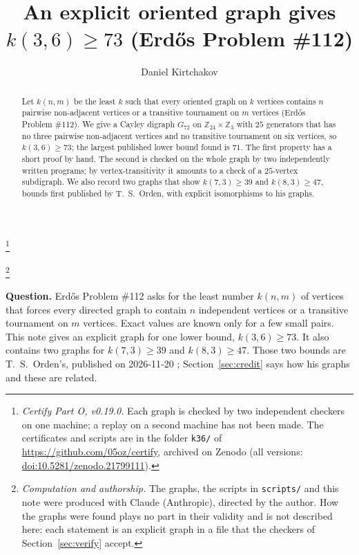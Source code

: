 \documentclass[11pt]{amsart}
\newcommand{\Z}{\mathbb{Z}}
\theoremstyle{plain}
\theoremstyle{definition}
\theoremstyle{remark}
\begin{document}
\title[An explicit oriented graph gives $k(3,6)\geq 73$]{An explicit oriented graph gives
$k(3,6)\geq 73$ (Erd\H{o}s Problem \#112)}

\author{Daniel Kirtchakov}
\address{Independent researcher (\texttt{05oz}); no institutional affiliation. ORCID:
\href{https://orcid.org/0009-0009-5213-4098}{0009-0009-5213-4098}.}

\thanks{\emph{Certify Part O, v0.19.0.} Each graph is checked by two independent checkers on one
machine; a replay on a second machine has not been made. The certificates and scripts are in the
folder \texttt{k36/} of \url{https://github.com/05oz/certify}, archived on Zenodo (all versions:
\href{https://doi.org/10.5281/zenodo.21799111}{doi:10.5281/zenodo.21799111}).}

\thanks{\emph{Computation and authorship.} The graphs, the scripts in \texttt{scripts/} and this
note were produced with Claude (Anthropic), directed by the author. How the graphs were found plays
no part in their validity and is not described here: each statement is an explicit graph in a file
that the checkers of Section~\ref{sec:verify} accept.}

\begin{abstract}
Let $k(n,m)$ be the least $k$ such that every oriented graph on $k$ vertices contains $n$ pairwise
non-adjacent vertices or a transitive tournament on $m$ vertices (Erd\H{o}s Problem \#112). We give
a Cayley digraph $G_{72}$ on $\Z_{24}\times\Z_3$ with $25$ generators that has no three pairwise
non-adjacent vertices and no transitive tournament on six vertices, so $k(3,6)\geq 73$; the largest
published lower bound found is $71$. The first property has a short proof by hand. The second is
checked on the whole graph by two independently written programs; by vertex-transitivity it
amounts to a check of a $25$-vertex subdigraph. We also record two graphs that show
$k(7,3)\geq 39$ and $k(8,3)\geq 47$, bounds first published by T.~S.~Orden, with explicit
isomorphisms to his graphs.
\end{abstract}

\maketitle

\noindent\textbf{Question.} Erd\H{o}s Problem \#112 asks for the least number $k(n,m)$ of vertices
that forces every directed graph to contain $n$ independent vertices or a transitive tournament on
$m$ vertices. Exact values are known only for a few small pairs. This note gives an explicit graph
for one lower bound, $k(3,6)\geq 73$. It also contains two graphs for $k(7,3)\geq 39$ and
$k(8,3)\geq 47$. Those two bounds are T.~S.~Orden's, published on 2026-11-20 \cite{Orden2};
Section~\ref{sec:credit} says how his graphs and these are related.
\end{document}
